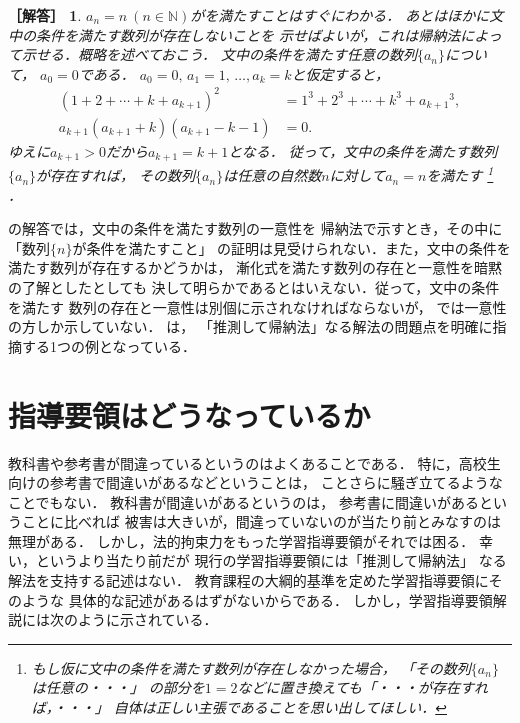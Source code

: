 \documentclass[11pt,a4paper]{ltjsarticle} %
\theoremstyle{mystyle} %
\newtheorem*{ans}{［解答］} %
\begin{document}
\begin{ans}
  $a_n = n \ (n \in \mathbb{N})$がを満たすことはすぐにわかる．
  あとはほかに文中の条件を満たす数列が存在しないことを
  示せばよいが，これは帰納法によって示せる．概略を述べておこう．
  文中の条件を満たす任意の数列$\{ a_n \}$について，
  $a_0 = 0$である．
  $a_0=0, \, a_1=1, \, \ldots, a_k = k$と仮定すると，
  \begin{align*}
    (1+2+ \cdots + k + a_{k+1})^2 & = 1^3 + 2^3 + \cdots + k^3 + {a_{k+1}} ^3, \\
    a_{k+1}(a_{k+1} + k) (a_{k+1} - k - 1) & = 0.
  \end{align*}
    ゆえに$a_{k+1} > 0$だから$a_{k+1} = k+1$となる．
    従って，文中の条件を満たす数列$\{ a_n \}$が\emph{存在すれば}，
    その数列$\{ a_n \}$は任意の自然数$n$に対して$a_n = n$を満たす
    \footnote{
      もし仮に文中の条件を満たす数列が存在しなかった場合，
      「その数列$\{ a_n \}$は任意の・・・」
      の部分を$1=2$などに置き換えても「・・・が存在すれば，・・・」
      自体は正しい主張であることを思い出してほしい．
    }
    ．
\end{ans}

の解答では，文中の条件を満たす数列の一意性を
帰納法で示すとき，その中に「数列$\{ n \}$が条件を満たすこと」
の証明は見受けられない．また，文中の条件を満たす数列が存在するかどうかは，
漸化式を満たす数列の存在と一意性を暗黙の了解としたとしても
決して明らかであるとはいえない．従って，文中の条件を満たす
数列の存在と一意性は別個に示されなければならないが，
\cite{chert}では一意性の方しか示していない．
は，
「推測して帰納法」なる解法の問題点を明確に指摘する1つの例となっている．



\section{指導要領はどうなっているか}
教科書や参考書が間違っているというのはよくあることである．
特に，高校生向けの参考書で間違いがあるなどということは，
ことさらに騒ぎ立てるようなことでもない．
教科書が間違いがあるというのは，
参考書に間違いがあるということに比べれば
被害は大きいが，間違っていないのが当たり前とみなすのは無理がある．
しかし，法的拘束力をもった学習指導要領がそれでは困る．
幸い，というより当たり前だが
現行の学習指導要領\cite{youryou}には「推測して帰納法」
なる解法を支持する記述はない．
教育課程の大綱的基準を定めた学習指導要領にそのような
具体的な記述があるはずがないからである．
しかし，学習指導要領解説\cite{youryoukai}には次のように示されている．
\end{document}
